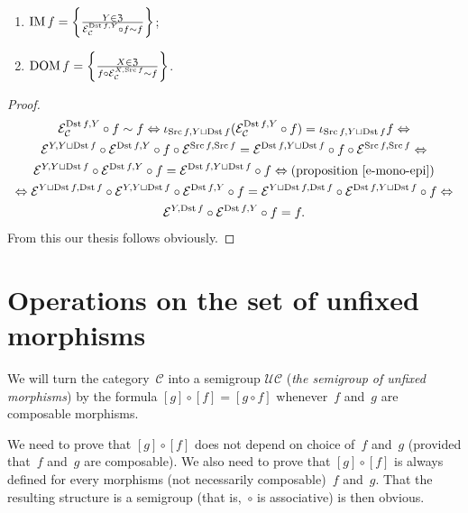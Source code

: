 \begin{prop}
~
\begin{enumerate}
\item $\operatorname{IM} f = \left\{ \frac{Y \in \mathfrak{Z}}{
  \mathcal{E}_{\mathcal{C}}^{\operatorname{Dst} f, Y} \circ f \sim f}\right\}$;
\item $\operatorname{DOM} f = \left\{ \frac{X \in \mathfrak{Z}}{
  f\circ\mathcal{E}_{\mathcal{C}}^{X, \operatorname{Src} f} \sim f}\right\}$.
\end{enumerate}
\end{prop}

\begin{proof}
~
\begin{multline*}
\mathcal{E}_{\mathcal{C}}^{\operatorname{Dst} f, Y} \circ f \sim f
\Leftrightarrow
\iota_{\operatorname{Src} f,Y\sqcup\operatorname{Dst} f}
(\mathcal{E}_{\mathcal{C}}^{\operatorname{Dst} f, Y} \circ f) =
\iota_{\operatorname{Src} f,Y\sqcup\operatorname{Dst} f}f \Leftrightarrow \\
\mathcal{E}^{Y,Y\sqcup\operatorname{Dst} f}\circ\mathcal{E}^{\operatorname{Dst} f, Y} \circ f \circ \mathcal{E}^{\operatorname{Src} f,\operatorname{Src} f} =
\mathcal{E}^{\operatorname{Dst} f,Y\sqcup\operatorname{Dst} f}\circ f\circ\mathcal{E}^{\operatorname{Src} f,\operatorname{Src} f} \Leftrightarrow \\
\mathcal{E}^{Y,Y\sqcup\operatorname{Dst} f}\circ\mathcal{E}^{\operatorname{Dst} f, Y}\circ f=\mathcal{E}^{\operatorname{Dst} f,Y\sqcup\operatorname{Dst} f}\circ f
\Leftrightarrow \text{(proposition~\ref{e-mono-epi})} \\ \Leftrightarrow
\mathcal{E}^{Y\sqcup\operatorname{Dst} f,\operatorname{Dst} f}\circ \mathcal{E}^{Y,Y\sqcup\operatorname{Dst} f}\circ\mathcal{E}^{\operatorname{Dst} f, Y}\circ f=\mathcal{E}^{Y\sqcup\operatorname{Dst} f,\operatorname{Dst} f}\circ \mathcal{E}^{\operatorname{Dst} f,Y\sqcup\operatorname{Dst} f}\circ f \Leftrightarrow \\
\mathcal{E}^{Y,\operatorname{Dst} f}\circ\mathcal{E}^{\operatorname{Dst} f,Y}\circ f = f.
\end{multline*}
From this our thesis follows obviously.
\end{proof}

\section{Operations on the set of unfixed morphisms}

\begin{defn}
We will turn the category~$\mathcal{C}$ into a semigroup
$\mathcal{U}\mathcal{C}$
(\emph{the semigroup of unfixed morphisms}) by
the formula $[g]\circ[f] = [g\circ f]$ whenever~$f$ and~$g$
are composable morphisms.
\end{defn}

We need to prove that $[g]\circ[f]$ does not depend on
choice of~$f$ and~$g$ (provided that~$f$ and~$g$
are composable). We also need to prove that $[g]\circ[f]$
is always defined for every morphisms (not necessarily
composable)~$f$ and~$g$. That the resulting structure is
a semigroup (that is,~$\circ$ is associative) is then
obvious.

